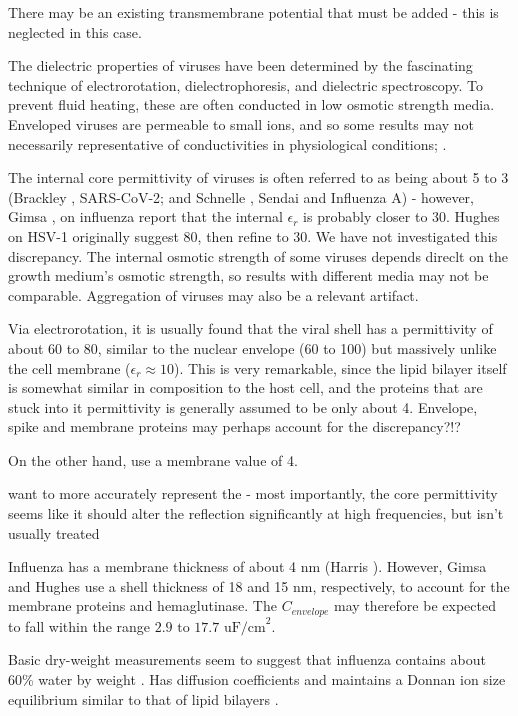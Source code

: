 \documentclass[fleqn,10pt]{paper}
\begin{document}
There may be an existing transmembrane potential that must be added - this is neglected in this case.

The dielectric properties of viruses have been determined by the fascinating technique of electrorotation, dielectrophoresis, and dielectric spectroscopy. To prevent fluid heating, these are often conducted in low osmotic strength media. Enveloped viruses are permeable to small ions, and so some results may not necessarily representative of conductivities in physiological conditions; \cite{Assessment}.

The internal core permittivity of viruses is often referred to as being about 5 to 3 (Brackley \cite{Electrostatic2020}, SARS-CoV-2; and Schnelle \cite{Trapping1996}, Sendai and Influenza A) - however, Gimsa \cite{New1999}, on influenza report that the internal $\epsilon_r$ is probably closer to 30. Hughes on HSV-1 originally suggest 80\cite{Manipulation1998}, then refine to 30\cite{Dielectrophoretic2001}. We have not investigated this discrepancy. The internal osmotic strength of some viruses depends direclt on the growth medium's osmotic strength\cite{Osmotic2003}, so results with different media may not be comparable. Aggregation of viruses may also be a relevant artifact. 

Via electrorotation, it is usually found that the viral shell has a permittivity of about 60 to 80, similar to the nuclear envelope (60 to 100) but massively unlike the cell membrane ($\epsilon_r\approx 10$). This is very remarkable, since the lipid bilayer itself is somewhat similar in composition to the host cell, and the proteins that are stuck into it permittivity is generally assumed to be only about 4. Envelope, spike and membrane proteins may perhaps account for the discrepancy?!?

On the other hand, \cite{Electrostatic2020a} use a membrane value of 4.

want to more accurately represent the - most importantly, the core permittivity seems like it should alter the reflection significantly at high frequencies, but isn't usually treated 

Influenza has a membrane thickness of about 4 nm (Harris \cite{Influenza2006}). However, Gimsa and Hughes use a shell thickness of 18 and 15 nm, respectively, to account for the membrane proteins and hemaglutinase. The $C_{envelope}$ may therefore be expected to fall within the range $2.9 \text{ to } 17.7 \text{ uF/cm}^2$.

Basic dry-weight measurements seem to suggest that influenza contains about 60\% water by weight \cite{lauffer1944biophysical}. Has diffusion coefficients and maintains a Donnan ion size equilibrium similar to that of lipid bilayers \cite{Effect2015b}.
\end{document}
